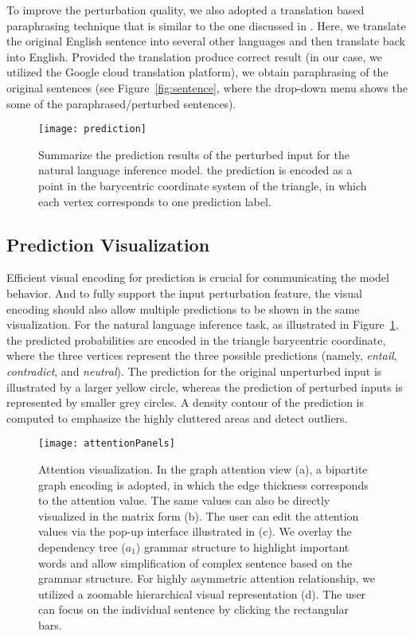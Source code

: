 To improve the perturbation quality, we also adopted a translation based paraphrasing technique that is similar to the one discussed in \cite{mallinson2017paraphrasing}. Here, we translate the original English sentence into several other languages and then translate back into English. Provided the translation produce correct result (in our case, we utilized the Google cloud translation platform), we obtain paraphrasing of the original sentences (see Figure~\ref{fig:sentence}, where the drop-down menu shows the some of the paraphrased/perturbed sentences).

\begin{figure}[htbp]
\centering
\vspace{-2mm}
 \texttt{[image: prediction]}
 \caption{
Summarize the prediction results of the perturbed input for the natural language inference model.
the prediction is encoded as a point in the barycentric coordinate system of the triangle, in which each vertex corresponds to one prediction label.
}
\vspace{-3mm}
\label{fig:prediction}
\end{figure}

\subsection{Prediction Visualization}
Efficient visual encoding for prediction is crucial for communicating the model behavior. And to fully support the input perturbation feature, the visual encoding should also allow multiple predictions to be shown in the same visualization.
%
For the natural language inference task, as illustrated in Figure~\ref{fig:prediction}, the predicted probabilities are encoded in the triangle barycentric coordinate, where the three vertices represent the three possible predictions (namely, \emph{entail}, \emph{contradict}, and \emph{neutral}). The prediction for the original unperturbed input is illustrated by a larger yellow circle, whereas the prediction of perturbed inputs is represented by smaller grey circles.
A density contour of the prediction is computed to emphasize the highly cluttered areas and detect outliers.

\begin{figure*}[t]
\centering
\vspace{-2mm}
 \texttt{[image: attentionPanels]}
  \vspace{-3mm}
 \caption{
Attention visualization. In the graph attention view (a), a bipartite graph encoding is adopted, in which the edge thickness corresponds to the attention value. The same values can also be directly visualized in the matrix form (b). 
The user can edit the attention values via the pop-up interface illustrated in (c).
We overlay the dependency tree ($a_1$) grammar structure to highlight important words and allow simplification of complex sentence based on the grammar structure.
%
For highly asymmetric attention relationship, we utilized a zoomable hierarchical visual representation (d). The user can focus on the individual sentence by clicking the rectangular bars.
}
\vspace{-3mm}
\label{fig:attentionVis}
\end{figure*}

